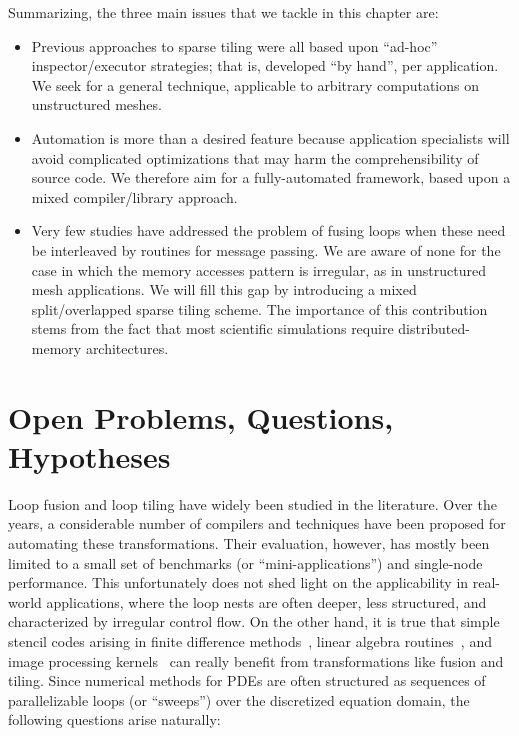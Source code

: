 Summarizing, the three main issues that we tackle in this chapter are:

\begin{itemize}
\item Previous approaches to sparse tiling were all based upon ``ad-hoc'' inspector/executor strategies; that is, developed ``by hand'', per application. We seek for a general technique, applicable to arbitrary computations on unstructured meshes.
\item Automation is more than a desired feature because application specialists will avoid complicated optimizations that may harm the comprehensibility of source code. We therefore aim for a fully-automated framework, based upon a mixed compiler/library approach.
\item Very few studies have addressed the problem of fusing loops when these need be interleaved by routines for message passing. We are aware of none for the case in which the memory accesses pattern is irregular, as in unstructured mesh applications. We will fill this gap by introducing a mixed split/overlapped sparse tiling scheme. The importance of this contribution stems from the fact that most scientific simulations require distributed-memory architectures.
\end{itemize}

\section{Open Problems, Questions, Hypotheses}
\label{sec:tiling:struct}
Loop fusion and loop tiling have widely been studied in the literature. Over the years, a considerable number of compilers and techniques have been proposed for automating these transformations. Their evaluation, however, has mostly been limited to a small set of benchmarks (or ``mini-applications'') and single-node performance. This unfortunately does not shed light on the applicability in real-world applications, where the loop nests are often deeper, less structured, and characterized by irregular control flow. On the other hand, it is true that simple stencil codes arising in finite difference methods~\citep{vect-tiled-ho-fd,ics-stencil-tiling,cohen-timetiling}, linear algebra routines~\citep{qr-fact-tiled,blas-tiling}, and image processing kernels~\citep{Halide} can really benefit from transformations like fusion and tiling. Since numerical methods for PDEs are often structured as sequences of parallelizable loops (or ``sweeps'') over the discretized equation domain, the following questions arise naturally: 


